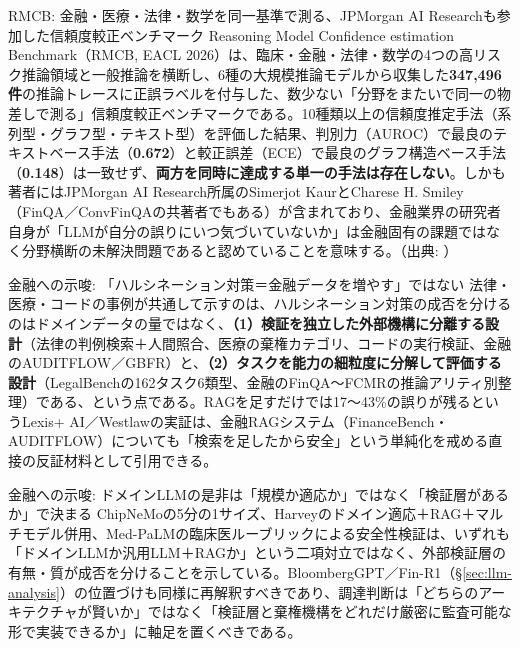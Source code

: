 \begin{casestudy}{RMCB: 金融・医療・法律・数学を同一基準で測る、JPMorgan AI Researchも参加した信頼度較正ベンチマーク}
Reasoning Model Confidence estimation Benchmark（RMCB, EACL 2026）は、臨床・金融・法律・数学の4つの高リスク推論領域と一般推論を横断し、6種の大規模推論モデルから収集した\textbf{347,496件}の推論トレースに正誤ラベルを付与した、数少ない「分野をまたいで同一の物差しで測る」信頼度較正ベンチマークである。10種類以上の信頼度推定手法（系列型・グラフ型・テキスト型）を評価した結果、判別力（AUROC）で最良のテキストベース手法（\textbf{0.672}）と較正誤差（ECE）で最良のグラフ構造ベース手法（\textbf{0.148}）は一致せず、\textbf{両方を同時に達成する単一の手法は存在しない}。しかも著者にはJPMorgan AI Research所属のSimerjot KaurとCharese H. Smiley（FinQA／ConvFinQA\cite{x05finqa2021,x05convfinqa2022}の共著者でもある）が含まれており、金融業界の研究者自身が「LLMが自分の誤りにいつ気づいていないか」は金融固有の課題ではなく分野横断の未解決問題であると認めていることを意味する。（出典: \cite{y05rmcb2026}）
\end{casestudy}

\begin{insight}{金融への示唆: 「ハルシネーション対策＝金融データを増やす」ではない}
法律・医療・コードの事例が共通して示すのは、ハルシネーション対策の成否を分けるのはドメインデータの量ではなく、\textbf{（1）検証を独立した外部機構に分離する設計}（法律の判例検索＋人間照合、医療の棄権カテゴリ、コードの実行検証、金融のAUDITFLOW／GBFR）と、\textbf{（2）タスクを能力の細粒度に分解して評価する設計}（LegalBenchの162タスク6類型、金融のFinQA〜FCMRの推論アリティ別整理）である、という点である。RAGを足すだけでは17〜43\%の誤りが残るというLexis+ AI／Westlawの実証は、金融RAGシステム（FinanceBench・AUDITFLOW）についても「検索を足したから安全」という単純化を戒める直接の反証材料として引用できる。
\end{insight}

\begin{insight}{金融への示唆: ドメインLLMの是非は「規模か適応か」ではなく「検証層があるか」で決まる}
ChipNeMoの5分の1サイズ、Harveyのドメイン適応＋RAG＋マルチモデル併用、Med-PaLMの臨床医ルーブリックによる安全性検証は、いずれも「ドメインLLMか汎用LLM＋RAGか」という二項対立ではなく、外部検証層の有無・質が成否を分けることを示している。BloombergGPT／Fin-R1（\S\ref{sec:llm-analysis}）の位置づけも同様に再解釈すべきであり、調達判断は「どちらのアーキテクチャが賢いか」ではなく「検証層と棄権機構をどれだけ厳密に監査可能な形で実装できるか」に軸足を置くべきである。
\end{insight}

